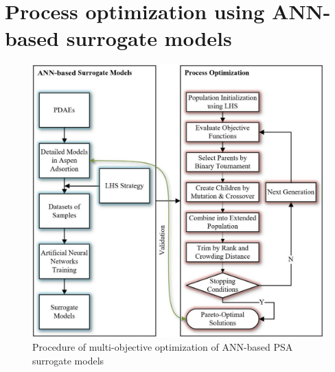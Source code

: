 \documentclass[preprint,12pt]{elsarticle}
\begin{document}
\section{Process optimization using ANN-based surrogate models}
\begin{figure}
	\centering
	\includegraphics[width=1\textwidth]{figs/Fig8.pdf}
	\caption{Procedure of multi-objective optimization of ANN-based PSA surrogate models}
	\label{FIG:8}
\end{figure}
\end{document}
